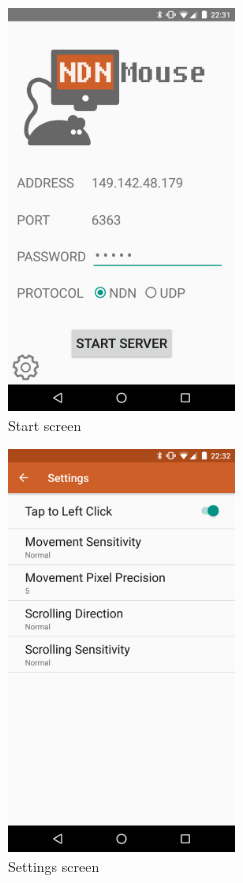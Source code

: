 \documentclass{sig-alternate}
\renewcommand\_{\textunderscore\allowbreak}  %
\begin{document}
\begin{figure}[hp]
	\hypertarget{fig:start}{}
	\centering
	\includegraphics[width=6cm]{screenshots/start}
	\caption{Start screen}
\end{figure}

\begin{figure}[hp]
	\hypertarget{fig:settings}{}
	\centering
	\includegraphics[width=6cm]{screenshots/settings}
	\caption{Settings screen}
\end{figure}
\end{document}

